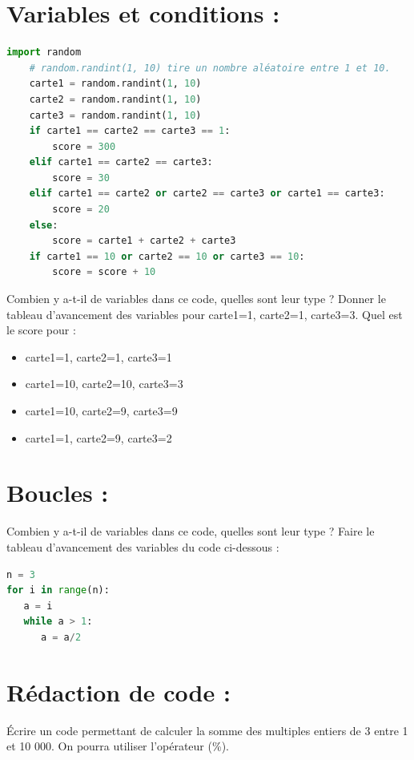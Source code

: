 \documentclass[a4paper, noanswers, addpoints, 12pt]{exam}
\begin{document}
\begin{questions}
\section{Variables et conditions : }

\begin{lstlisting}[language=Python]
    import random
    # random.randint(1, 10) tire un nombre aléatoire entre 1 et 10.
    carte1 = random.randint(1, 10)
    carte2 = random.randint(1, 10)
    carte3 = random.randint(1, 10)
    if carte1 == carte2 == carte3 == 1:
        score = 300
    elif carte1 == carte2 == carte3:
        score = 30
    elif carte1 == carte2 or carte2 == carte3 or carte1 == carte3:
        score = 20
    else:
        score = carte1 + carte2 + carte3
    if carte1 == 10 or carte2 == 10 or carte3 == 10:
        score = score + 10
\end{lstlisting}
\question[1] Combien y a-t-il de variables dans ce code, quelles sont leur type ?
\question[3] Donner le tableau d'avancement des variables pour carte1=1, carte2=1, carte3=3.
\question[2] Quel est le score pour :
\begin{itemize}
    \item carte1=1, carte2=1, carte3=1
    \item carte1=10, carte2=10, carte3=3
    \item carte1=10, carte2=9, carte3=9
    \item carte1=1, carte2=9, carte3=2
\end{itemize}

\section{Boucles : }

\question[1] Combien y a-t-il de variables dans ce code, quelles sont leur type ?
\question[4] Faire le tableau d'avancement des variables du code ci-dessous :
\begin{lstlisting}[language=Python]
n = 3
for i in range(n):
   a = i
   while a > 1:
      a = a/2
\end{lstlisting}

\section{Rédaction de code : }
\question[3] Écrire un code permettant de calculer la somme des multiples entiers de 3 entre 1 et 10 000. On pourra utiliser l'opérateur (\%).


\end{questions}
\end{document}
